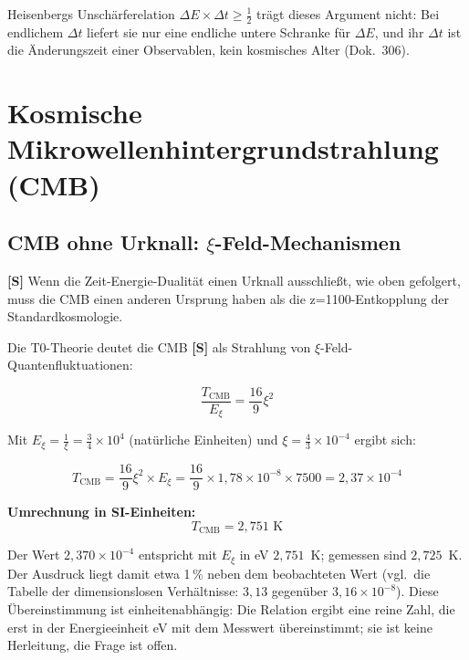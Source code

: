 	Heisenbergs Unschärferelation $\Delta E \times \Delta t \geq \frac{1}{2}$ trägt dieses Argument nicht: Bei endlichem $\Delta t$ liefert sie nur eine endliche untere Schranke für $\Delta E$, und ihr $\Delta t$ ist die Änderungszeit einer Observablen, kein kosmisches Alter (Dok.~306).

	\section{Kosmische Mikrowellenhintergrundstrahlung (CMB)}
	
	\subsection{CMB ohne Urknall: $\xi$-Feld-Mechanismen}
	
	\begin{revolutionary}[These]
		\textbf{[S]} Wenn die Zeit-Energie-Dualität einen Urknall ausschließt, wie oben gefolgert, muss die CMB einen anderen Ursprung haben als die z=1100-Entkopplung der Standardkosmologie.
	\end{revolutionary}
	
	Die T0-Theorie deutet die CMB \textbf{[S]} als Strahlung von $\xi$-Feld-Quantenfluktuationen:
	
	\begin{equation}
		\frac{T_{\text{CMB}}}{E_\xi} = \frac{16}{9} \xi^2
	\end{equation}
	
	Mit $E_\xi = \frac{1}{\xi} = \frac{3}{4} \times 10^4$ (natürliche Einheiten) und $\xi = \frac{4}{3} \times 10^{-4}$ ergibt sich:
	
	\begin{equation}
		T_{\text{CMB}} = \frac{16}{9} \xi^2 \times E_\xi = \frac{16}{9} \times 1{,}78 \times 10^{-8} \times 7500 = 2{,}37 \times 10^{-4}
	\end{equation}
	
	\textbf{Umrechnung in SI-Einheiten:}
	\begin{equation}
		T_{\text{CMB}} = 2{,}751 \text{ K}
	\end{equation}
	
	Der Wert $2{,}370\times10^{-4}$ entspricht mit $E_\xi$ in eV $2{,}751$~K; gemessen sind $2{,}725$~K. Der Ausdruck liegt damit etwa 1\,\% neben dem beobachteten Wert (vgl.\ die Tabelle der dimensionslosen Verhältnisse: $3{,}13$ gegenüber $3{,}16 \times 10^{-8}$). Diese Übereinstimmung ist einheitenabhängig: Die Relation ergibt eine reine Zahl, die erst in der Energieeinheit eV mit dem Messwert übereinstimmt; sie ist keine Herleitung, die Frage ist offen.
	
